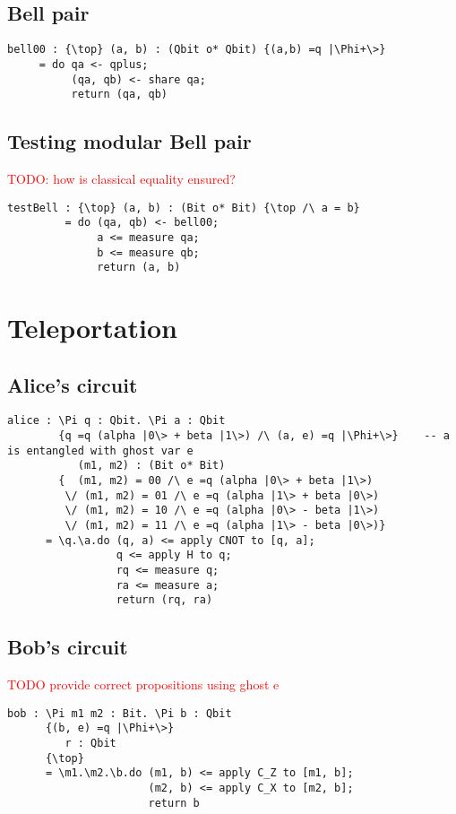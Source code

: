 \documentclass[acmsmall,nonacm,timestamp,review=false,anonymous=false]{acmart}
\newcommand{\todo}[1]{\textcolor{red}{#1}}
\begin{document}
\subsection{Bell pair}
\begin{lstlisting}[language=QHaskell]
bell00 : {\top} (a, b) : (Qbit o* Qbit) {(a,b) =q |\Phi+\>}
     = do qa <- qplus;
          (qa, qb) <- share qa;
          return (qa, qb)
\end{lstlisting}

\subsection{Testing modular Bell pair}
\todo{TODO: how is classical equality ensured?}
\begin{lstlisting}[language=QHaskell]
testBell : {\top} (a, b) : (Bit o* Bit) {\top /\ a = b}
         = do (qa, qb) <- bell00;
              a <= measure qa;
              b <= measure qb;
              return (a, b)
\end{lstlisting}

\section{Teleportation}
\label{app:teleport}
\subsection{Alice's circuit}
\begin{lstlisting}[language=QHaskell]
alice : \Pi q : Qbit. \Pi a : Qbit
        {q =q (alpha |0\> + beta |1\>) /\ (a, e) =q |\Phi+\>}    -- a is entangled with ghost var e
           (m1, m2) : (Bit o* Bit)
        {  (m1, m2) = 00 /\ e =q (alpha |0\> + beta |1\>)
         \/ (m1, m2) = 01 /\ e =q (alpha |1\> + beta |0\>)
         \/ (m1, m2) = 10 /\ e =q (alpha |0\> - beta |1\>)
         \/ (m1, m2) = 11 /\ e =q (alpha |1\> - beta |0\>)}
      = \q.\a.do (q, a) <= apply CNOT to [q, a];
                 q <= apply H to q;
                 rq <= measure q;
                 ra <= measure a;
                 return (rq, ra)
\end{lstlisting}

\subsection{Bob's circuit}
\todo{TODO provide correct propositions using ghost e}
\begin{lstlisting}[language=QHaskell]
bob : \Pi m1 m2 : Bit. \Pi b : Qbit
      {(b, e) =q |\Phi+\>}
         r : Qbit
      {\top}
      = \m1.\m2.\b.do (m1, b) <= apply C_Z to [m1, b];
                      (m2, b) <= apply C_X to [m2, b];
                      return b
\end{lstlisting}
\end{document}

